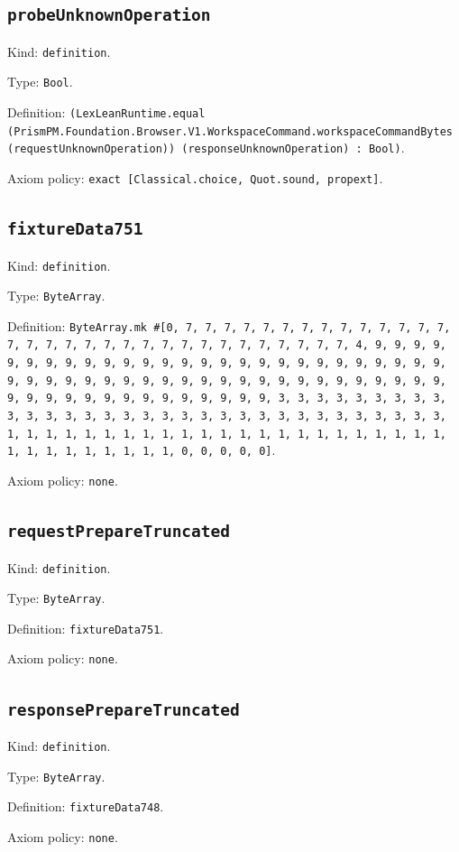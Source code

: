\documentclass[11pt]{article}
\begin{document}
\subsection*{\texttt{probeUnknownOperation}}
\noindent Kind: \texttt{definition}.\par
\noindent Type: \texttt{Bool}.\par
\noindent Definition: \texttt{(LexLeanRuntime.equal (PrismPM.Foundation.Browser.V1.WorkspaceCommand.workspaceCommandBytes (requestUnknownOperation)) (responseUnknownOperation) : Bool)}.\par
\noindent Axiom policy: \texttt{exact [Classical.choice, Quot.sound, propext]}.\par
\subsection*{\texttt{fixtureData751}}
\noindent Kind: \texttt{definition}.\par
\noindent Type: \texttt{ByteArray}.\par
\noindent Definition: \texttt{ByteArray.mk \#[0, 7, 7, 7, 7, 7, 7, 7, 7, 7, 7, 7, 7, 7, 7, 7, 7, 7, 7, 7, 7, 7, 7, 7, 7, 7, 7, 7, 7, 7, 7, 7, 7, 4, 9, 9, 9, 9, 9, 9, 9, 9, 9, 9, 9, 9, 9, 9, 9, 9, 9, 9, 9, 9, 9, 9, 9, 9, 9, 9, 9, 9, 9, 9, 9, 9, 9, 9, 9, 9, 9, 9, 9, 9, 9, 9, 9, 9, 9, 9, 9, 9, 9, 9, 9, 9, 9, 9, 9, 9, 9, 9, 9, 9, 9, 9, 9, 9, 3, 3, 3, 3, 3, 3, 3, 3, 3, 3, 3, 3, 3, 3, 3, 3, 3, 3, 3, 3, 3, 3, 3, 3, 3, 3, 3, 3, 3, 3, 3, 3, 1, 1, 1, 1, 1, 1, 1, 1, 1, 1, 1, 1, 1, 1, 1, 1, 1, 1, 1, 1, 1, 1, 1, 1, 1, 1, 1, 1, 1, 1, 1, 1, 0, 0, 0, 0, 0]}.\par
\noindent Axiom policy: \texttt{none}.\par
\subsection*{\texttt{requestPrepareTruncated}}
\noindent Kind: \texttt{definition}.\par
\noindent Type: \texttt{ByteArray}.\par
\noindent Definition: \texttt{fixtureData751}.\par
\noindent Axiom policy: \texttt{none}.\par
\subsection*{\texttt{responsePrepareTruncated}}
\noindent Kind: \texttt{definition}.\par
\noindent Type: \texttt{ByteArray}.\par
\noindent Definition: \texttt{fixtureData748}.\par
\noindent Axiom policy: \texttt{none}.\par
\end{document}
